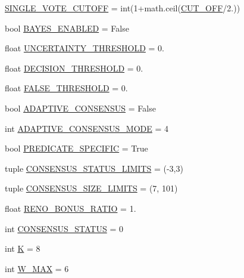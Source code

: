 \begin{DoxyCompactItemize}
\mbox{\hyperlink{namespacereorder_afa8e106b735033b706b1412e12f6783b}{S\+I\+N\+G\+L\+E\+\_\+\+V\+O\+T\+E\+\_\+\+C\+U\+T\+O\+FF}} = int(1+math.\+ceil(\mbox{\hyperlink{namespacereorder_a914791c176a78c026dc76a18bcd88d73}{C\+U\+T\+\_\+\+O\+FF}}/2.))
\item 
bool \mbox{\hyperlink{namespacereorder_adadcb301c2f0066591eaf0a4c08ac96d}{B\+A\+Y\+E\+S\+\_\+\+E\+N\+A\+B\+L\+ED}} = False
\item 
float \mbox{\hyperlink{namespacereorder_aaefdc27b85545eb4a910f5c65f7d8bbb}{U\+N\+C\+E\+R\+T\+A\+I\+N\+T\+Y\+\_\+\+T\+H\+R\+E\+S\+H\+O\+LD}} = 0.
\item 
float \mbox{\hyperlink{namespacereorder_ac4442b6c569574253ef445d09952d3f0}{D\+E\+C\+I\+S\+I\+O\+N\+\_\+\+T\+H\+R\+E\+S\+H\+O\+LD}} = 0.
\item 
float \mbox{\hyperlink{namespacereorder_a31317fa26792fa204392549329cc31cb}{F\+A\+L\+S\+E\+\_\+\+T\+H\+R\+E\+S\+H\+O\+LD}} = 0.
\item 
bool \mbox{\hyperlink{namespacereorder_a7b6800fe9bb5df8c84060ed96d9711ac}{A\+D\+A\+P\+T\+I\+V\+E\+\_\+\+C\+O\+N\+S\+E\+N\+S\+US}} = False
\item 
int \mbox{\hyperlink{namespacereorder_a394fa3f8531c2ecc987f982367a4af2d}{A\+D\+A\+P\+T\+I\+V\+E\+\_\+\+C\+O\+N\+S\+E\+N\+S\+U\+S\+\_\+\+M\+O\+DE}} = 4
\item 
bool \mbox{\hyperlink{namespacereorder_a2826a54e707f46fbd0fa2f8f6219ead7}{P\+R\+E\+D\+I\+C\+A\+T\+E\+\_\+\+S\+P\+E\+C\+I\+F\+IC}} = True
\item 
tuple \mbox{\hyperlink{namespacereorder_a36cac18f3d673a6f2cd86c88127e41b9}{C\+O\+N\+S\+E\+N\+S\+U\+S\+\_\+\+S\+T\+A\+T\+U\+S\+\_\+\+L\+I\+M\+I\+TS}} = (-\/3,3)
\item 
tuple \mbox{\hyperlink{namespacereorder_a1a20e4a8af9569eaef5eb5b23f07222b}{C\+O\+N\+S\+E\+N\+S\+U\+S\+\_\+\+S\+I\+Z\+E\+\_\+\+L\+I\+M\+I\+TS}} = (7, 101)
\item 
float \mbox{\hyperlink{namespacereorder_a18fd240c30a7c4a6ee9df12436a744ab}{R\+E\+N\+O\+\_\+\+B\+O\+N\+U\+S\+\_\+\+R\+A\+T\+IO}} = 1.
\item 
int \mbox{\hyperlink{namespacereorder_a090eab76b7b0e234f422b87e30adf793}{C\+O\+N\+S\+E\+N\+S\+U\+S\+\_\+\+S\+T\+A\+T\+US}} = 0
\item 
int \mbox{\hyperlink{namespacereorder_a2689c4b3931025b79053532a5f1b0a85}{K}} = 8
\item 
int \mbox{\hyperlink{namespacereorder_add63171ca968cbd5ca4d60dfbf9a2746}{W\+\_\+\+M\+AX}} = 6
\item 

\end{DoxyCompactItemize}
